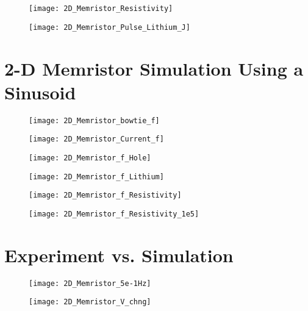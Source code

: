 \begin{figure}[!htp]
\centering
\texttt{[image: 2D\_Memristor\_Resistivity]}
\caption{} 
\label{}
\end{figure}



\begin{figure}[!htp]
\centering
\texttt{[image: 2D\_Memristor\_Pulse\_Lithium\_J]}
\caption{} 
\label{}
\end{figure}


\clearpage
\section{2-D Memristor Simulation Using a Sinusoid}

\begin{figure}[!htp]
\centering
\texttt{[image: 2D\_Memristor\_bowtie\_f]}
\caption{} 
\label{}
\end{figure}


\begin{figure}[!htp]
\centering
\texttt{[image: 2D\_Memristor\_Current\_f]}
\caption{} 
\label{}
\end{figure}

\begin{figure}[!htp]
\centering
\texttt{[image: 2D\_Memristor\_f\_Hole]}
\caption{} 
\label{}
\end{figure}

\begin{figure}[!htp]
\centering
\texttt{[image: 2D\_Memristor\_f\_Lithium]}
\caption{} 
\label{}
\end{figure}

\begin{figure}[!htp]
\centering
\texttt{[image: 2D\_Memristor\_f\_Resistivity]}
\caption{} 
\label{}
\end{figure}


\begin{figure}[!htp]
\centering
\texttt{[image: 2D\_Memristor\_f\_Resistivity\_1e5]}
\caption{} 
\label{}
\end{figure}

\clearpage
\section{Experiment vs. Simulation}



\begin{figure}[!htp]
\centering
\texttt{[image: 2D\_Memristor\_5e-1Hz]}
\caption{} 
\label{}
\end{figure}


\begin{figure}[!htp]
\centering
\texttt{[image: 2D\_Memristor\_V\_chng]}
\caption{} 
\label{}
\end{figure}
